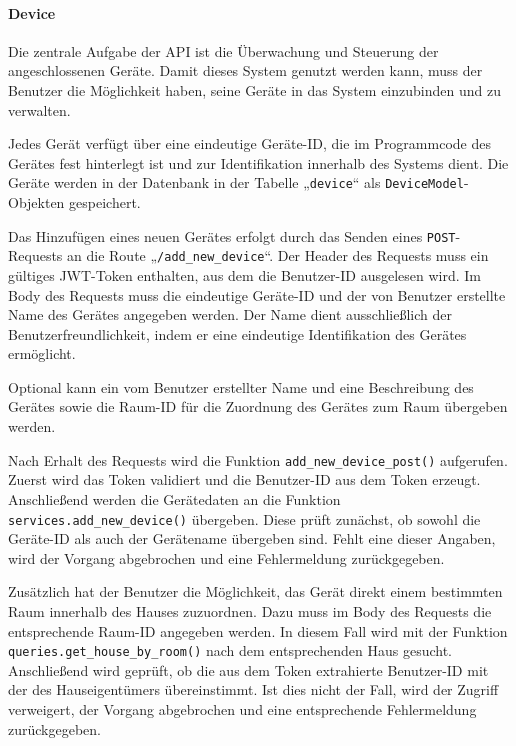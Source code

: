 \documentclass[12pt, letterpaper]{article}
\begin{document}
  \paragraph{Device}
  \par \textbf{}
  \par Die zentrale Aufgabe der API ist die Überwachung und Steuerung der angeschlossenen Geräte. Damit dieses System genutzt werden kann, muss der Benutzer die Möglichkeit haben, seine Geräte in das System einzubinden und zu verwalten.
  \par Jedes Gerät verfügt über eine eindeutige Geräte-ID, die im Programmcode des Gerätes fest hinterlegt ist und zur Identifikation innerhalb des Systems dient. Die Geräte werden in der Datenbank in der Tabelle „\texttt{device}“ als \texttt{DeviceModel}-Objekten gespeichert.
  \par Das Hinzufügen eines neuen Gerätes erfolgt durch das Senden eines \texttt{POST}-Requests an die Route „\texttt{/add\_new\_device}“. Der Header des Requests muss ein gültiges JWT-Token enthalten, aus dem die Benutzer-ID ausgelesen wird. Im Body des Requests muss die eindeutige Geräte-ID und der von Benutzer erstellte Name des Gerätes angegeben werden. Der Name dient ausschließlich der Benutzerfreundlichkeit, indem er eine eindeutige Identifikation des Gerätes ermöglicht.
  \par Optional kann ein vom Benutzer erstellter Name und eine Beschreibung des Gerätes sowie die Raum-ID für die Zuordnung des Gerätes zum Raum übergeben werden.  
  \par Nach Erhalt des Requests wird die Funktion \texttt{add\_new\_device\_post()} aufgerufen. Zuerst wird das Token validiert und die Benutzer-ID aus dem Token erzeugt. Anschließend werden die Gerätedaten an die Funktion \texttt{services.add\_new\_device()} übergeben. Diese prüft zunächst, ob sowohl die Geräte-ID als auch der Gerätename übergeben sind. Fehlt eine dieser Angaben, wird der Vorgang abgebrochen und eine Fehlermeldung zurückgegeben.
  \par Zusätzlich hat der Benutzer die Möglichkeit, das Gerät direkt einem bestimmten Raum innerhalb des Hauses zuzuordnen. Dazu muss im Body des Requests die entsprechende Raum-ID angegeben werden. In diesem Fall wird mit der Funktion \texttt{queries.get\_house\_by\_room()} nach dem entsprechenden Haus gesucht. Anschließend wird geprüft, ob die aus dem Token extrahierte Benutzer-ID mit der des Hauseigentümers übereinstimmt. Ist dies nicht der Fall, wird der Zugriff verweigert, der Vorgang abgebrochen und eine entsprechende Fehlermeldung zurückgegeben.
\end{document}
